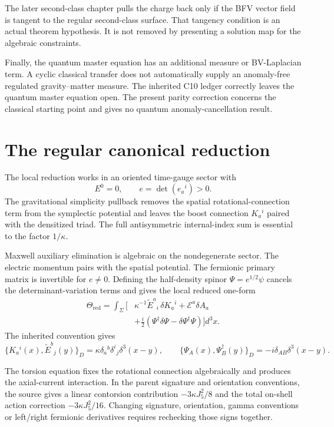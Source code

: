 The later second-class chapter pulls the charge back only if the BFV vector field is tangent to the regular second-class surface. That tangency condition is an actual theorem hypothesis. It is not removed by presenting a solution map for the algebraic constraints.

Finally, the quantum master equation has an additional measure or BV-Laplacian term. A cyclic classical transfer does not automatically supply an anomaly-free regulated gravity--matter measure. The inherited C10 ledger correctly leaves the quantum master equation open. The present parity correction concerns the classical starting point and gives no quantum anomaly-cancellation result.



\clearpage
\section{The regular canonical reduction}\label{c:verify:reduction}

The local reduction works in an oriented time-gauge sector with
\[
 E^0=0,\qquad e=\det(e_a{}^i)>0.
\]
The gravitational simplicity pullback removes the spatial rotational-connection term from the symplectic potential and leaves the boost connection \(K_a{}^i\) paired with the densitized triad. The full antisymmetric internal-index sum is essential to the factor \(1/\kappa\).

Maxwell auxiliary elimination is algebraic on the nondegenerate sector. The electric momentum pairs with the spatial potential. The fermionic primary matrix is invertible for \(e\ne0\). Defining the half-density spinor \(\Psi=e^{1/2}\psi\) cancels the determinant-variation terms and gives the local reduced one-form
\[
\begin{aligned}
 \Theta_{\mathrm{red}}=\int_\Sigma\bigg[
 &\kappa^{-1}\widetilde E^a{}_i\,\delta K_a{}^i
 +\mathcal E^a\delta A_a\\
 &+\frac{i}{2}
   (\Psi^\dagger\delta\Psi-\delta\Psi^\dagger\Psi)
 \bigg]d^3x.
\end{aligned}
\]
The inherited convention gives
\[
 \{K_a{}^i(x),\widetilde E^b{}_j(y)\}_{D}
 =\kappa\delta_a{}^b\delta^i{}_j\delta^3(x-y),
 \qquad
 \{\Psi_A(x),\Psi_B^\dagger(y)\}_{D}
 =-i\delta_{AB}\delta^3(x-y).
\]

The torsion equation fixes the rotational connection algebraically and produces the axial-current interaction. In the parent signature and orientation conventions, the source gives a linear contorsion contribution \(-3\kappa J_5^2/8\) and the total on-shell action correction \(-3\kappa J_5^2/16\). Changing signature, orientation, gamma conventions or left/right fermionic derivatives requires rechecking those signs together.

